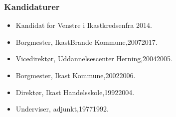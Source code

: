 \documentclass[11pt, a4paper]{awesome-cv}
\begin{document}
\begin{cvletter}
\subsubsection*{Kandidaturer}
\begin{itemize}
\item Kandidat for Venstre i Ikastkredsenfra 2014.
\end{itemize}
\begin{itemize}
\item Borgmester, IkastBrande Kommune,20072017.
\item Vicedirektør, Uddannelsescenter Herning,20042005.
\item Borgmester, Ikast Kommune,20022006.
\item Direktør, Ikast Handelsskole,19922004.
\item Underviser, adjunkt,19771992.
\end{itemize}
\end{cvletter}
\end{document}
